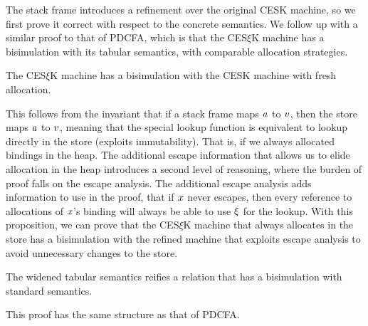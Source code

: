 The stack frame introduces a refinement over the original CESK machine, so we first prove it correct with respect to the concrete semantics.
%
We follow up with a similar proof to that of PDCFA, which is that the CES$\xi$K machine has a bisimulation with its tabular semantics, with comparable allocation strategies.
\begin{claim}\label{thm:refinement}
  The CES$\xi$K machine has a bisimulation with the CESK machine with fresh allocation.
\end{claim}
This follows from the invariant that if a stack frame maps $a$ to $v$, then the store maps $a$ to $v$, meaning that the special lookup function is equivalent to lookup directly in the store (exploits immutability).
%
That is, if we always allocated bindings in the heap.
%
The additional escape information that allows us to elide allocation in the heap introduces a second level of reasoning, where the burden of proof falls on the escape analysis.
%
The additional escape analysis adds information to use in the proof, that if $x$ never escapes, then every reference to allocations of $x$'s binding will always be able to use $\xi$ for the lookup.
%
With this proposition, we can prove that the CES$\xi$K machine that always allocates in the store has a bisimulation with the refined machine that exploits escape analysis to avoid unnecessary changes to the store.
%

\begin{claim}\label{thm:cfa2}
  The widened tabular semantics reifies a relation that has a bisimulation with standard semantics.
\end{claim}
This proof has the same structure as that of PDCFA.

